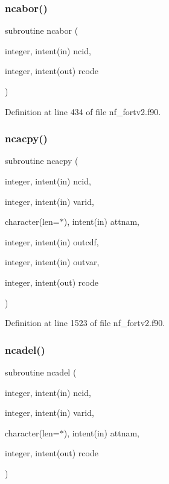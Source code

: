 \subsubsection{\texorpdfstring{ncabor()}{ncabor()}}
{\footnotesize\ttfamily subroutine ncabor (\begin{DoxyParamCaption}\item[{integer, intent(in)}]{ncid,  }\item[{integer, intent(out)}]{rcode }\end{DoxyParamCaption})}



Definition at line 434 of file nf\+\_\+fortv2.\+f90.

\mbox{\label{nf__fortv2_8f90_a251a629393e35281e714774eddea2551}} 
\subsubsection{\texorpdfstring{ncacpy()}{ncacpy()}}
{\footnotesize\ttfamily subroutine ncacpy (\begin{DoxyParamCaption}\item[{integer, intent(in)}]{ncid,  }\item[{integer, intent(in)}]{varid,  }\item[{character(len=$\ast$), intent(in)}]{attnam,  }\item[{integer, intent(in)}]{outcdf,  }\item[{integer, intent(in)}]{outvar,  }\item[{integer, intent(out)}]{rcode }\end{DoxyParamCaption})}



Definition at line 1523 of file nf\+\_\+fortv2.\+f90.

\mbox{\label{nf__fortv2_8f90_aca410e210247338c8c44f4cd02aacdec}} 
\subsubsection{\texorpdfstring{ncadel()}{ncadel()}}
{\footnotesize\ttfamily subroutine ncadel (\begin{DoxyParamCaption}\item[{integer, intent(in)}]{ncid,  }\item[{integer, intent(in)}]{varid,  }\item[{character(len=$\ast$), intent(in)}]{attnam,  }\item[{integer, intent(out)}]{rcode }\end{DoxyParamCaption})}



